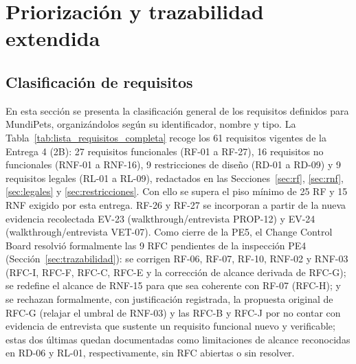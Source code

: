 \documentclass[journal,onecolumn]{IEEEtran}
\begin{document}
	\section{Priorización y trazabilidad extendida}
	\label{sec:priorizacion}
	
	\subsection{Clasificación de requisitos}
	\label{sec:clasificacion}
	
	En esta sección se presenta la clasificación general de los requisitos
	definidos para MundiPets, organizándolos según su identificador, nombre y
	tipo. La Tabla~\ref{tab:lista_requisitos_completa} recoge los 61 requisitos
	vigentes de la Entrega 4 (2B): 27 requisitos funcionales (RF-01 a RF-27),
	16 requisitos no funcionales (RNF-01 a RNF-16), 9 restricciones de diseño
	(RD-01 a RD-09) y 9 requisitos legales (RL-01 a RL-09), redactados en las
	Secciones~\ref{sec:rf}, \ref{sec:rnf}, \ref{sec:legales} y
	\ref{sec:restricciones}. Con ello se supera el piso mínimo de 25 RF y 15 RNF
	exigido por esta entrega. RF-26 y RF-27 se incorporan a partir de la nueva
	evidencia recolectada EV-23 (walkthrough/entrevista PROP-12) y EV-24
	(walkthrough/entrevista VET-07). Como cierre de la PE5, el Change Control Board resolvió formalmente
	las 9 RFC pendientes de la inspección PE4 (Sección~\ref{sec:trazabilidad}):
	se corrigen RF-06, RF-07, RF-10, RNF-02 y RNF-03 (RFC-I, RFC-F, RFC-C,
	RFC-E y la corrección de alcance derivada de RFC-G); se redefine el
	alcance de RNF-15 para que sea coherente con RF-07 (RFC-H); y se
	rechazan formalmente, con justificación registrada, la propuesta
	original de RFC-G (relajar el umbral de RNF-03) y las RFC-B y RFC-J por
	no contar con evidencia de entrevista que sustente un requisito
	funcional nuevo y verificable; estas dos últimas quedan documentadas
	como limitaciones de alcance reconocidas en RD-06 y RL-01,
	respectivamente, sin RFC abiertas o sin resolver.
	
\end{document}
